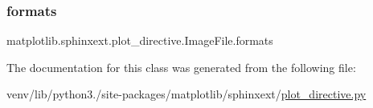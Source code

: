 \subsubsection{\texorpdfstring{formats}{formats}}
{\footnotesize\ttfamily matplotlib.\+sphinxext.\+plot\+\_\+directive.\+Image\+File.\+formats}



The documentation for this class was generated from the following file\+:\begin{DoxyCompactItemize}
\item 
venv/lib/python3./site-\/packages/matplotlib/sphinxext/\hyperlink{plot__directive_8py}{plot\+\_\+directive.\+py}\end{DoxyCompactItemize}
